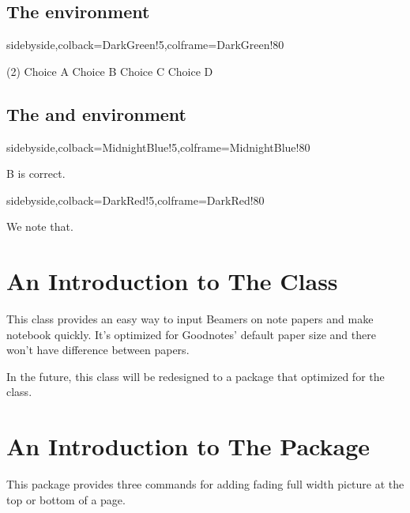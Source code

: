 \documentclass[ans,mtpro2]{litesolution}
\begin{document}
\subsection{The  environment}

\begin{tcblisting}{sidebyside,colback=DarkGreen!5,colframe=DarkGreen!80}
\begin{problem}\leavevmode
\begin{tasks}(2)
  \task Choice A  \task[\true] Choice B
  \task Choice C  \task Choice D
\end{tasks}
\end{problem}
\end{tcblisting}

\subsection{The  and  environment}

\begin{minipage}{.48\textwidth}
\begin{tcblisting}{sidebyside,colback=MidnightBlue!5,colframe=MidnightBlue!80}
\begin{solution}
  B is correct.
\end{solution}
\end{tcblisting}
\end{minipage}
\hfill
\begin{minipage}{.48\textwidth}
\begin{tcblisting}{sidebyside,colback=DarkRed!5,colframe=DarkRed!80}
\begin{note}
  We note that.
\end{note}
\end{tcblisting}    
\end{minipage}

\appendix
\def\thesection{Appendix \Alph{section}}

\section{An Introduction to The  Class}

This class provides an easy way to input Beamers on note papers and make notebook quickly. It's optimized for Goodnotes' default paper size and there won't have difference between papers.

In the future, this class will be redesigned to a package that optimized for the  class.

\section{An Introduction to The  Package}

This package provides three commands for adding fading full width picture at the top or bottom of a page.
\end{document}
